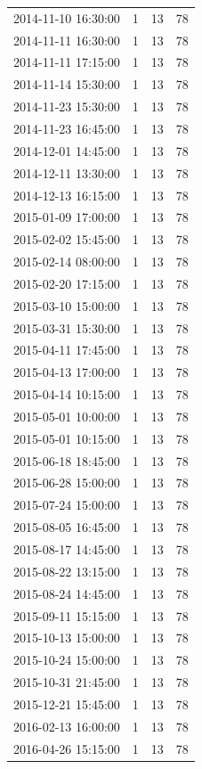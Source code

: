 \begin{tabular}{lrrr}
2014-11-10 16:30:00 & 1 & 13 & 78 \\
2014-11-11 16:30:00 & 1 & 13 & 78 \\
2014-11-11 17:15:00 & 1 & 13 & 78 \\
2014-11-14 15:30:00 & 1 & 13 & 78 \\
2014-11-23 15:30:00 & 1 & 13 & 78 \\
2014-11-23 16:45:00 & 1 & 13 & 78 \\
2014-12-01 14:45:00 & 1 & 13 & 78 \\
2014-12-11 13:30:00 & 1 & 13 & 78 \\
2014-12-13 16:15:00 & 1 & 13 & 78 \\
2015-01-09 17:00:00 & 1 & 13 & 78 \\
2015-02-02 15:45:00 & 1 & 13 & 78 \\
2015-02-14 08:00:00 & 1 & 13 & 78 \\
2015-02-20 17:15:00 & 1 & 13 & 78 \\
2015-03-10 15:00:00 & 1 & 13 & 78 \\
2015-03-31 15:30:00 & 1 & 13 & 78 \\
2015-04-11 17:45:00 & 1 & 13 & 78 \\
2015-04-13 17:00:00 & 1 & 13 & 78 \\
2015-04-14 10:15:00 & 1 & 13 & 78 \\
2015-05-01 10:00:00 & 1 & 13 & 78 \\
2015-05-01 10:15:00 & 1 & 13 & 78 \\
2015-06-18 18:45:00 & 1 & 13 & 78 \\
2015-06-28 15:00:00 & 1 & 13 & 78 \\
2015-07-24 15:00:00 & 1 & 13 & 78 \\
2015-08-05 16:45:00 & 1 & 13 & 78 \\
2015-08-17 14:45:00 & 1 & 13 & 78 \\
2015-08-22 13:15:00 & 1 & 13 & 78 \\
2015-08-24 14:45:00 & 1 & 13 & 78 \\
2015-09-11 15:15:00 & 1 & 13 & 78 \\
2015-10-13 15:00:00 & 1 & 13 & 78 \\
2015-10-24 15:00:00 & 1 & 13 & 78 \\
2015-10-31 21:45:00 & 1 & 13 & 78 \\
2015-12-21 15:45:00 & 1 & 13 & 78 \\
2016-02-13 16:00:00 & 1 & 13 & 78 \\
2016-04-26 15:15:00 & 1 & 13 & 78 \\

\end{tabular}
